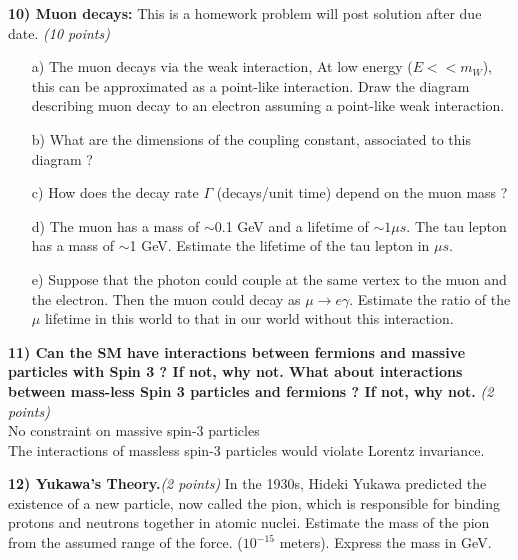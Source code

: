 {\textbf{10) Muon decays: } This is a homework problem will post solution after due date. \hfill \textit{(10 points)}\\
\begin{itemize}
  \item[a)]{ The muon decays via the weak interaction,  At low energy ($E << m_W$), this can be approximated as a point-like interaction. 
  Draw the diagram describing muon decay to an electron assuming a point-like weak interaction.
\vspace*{1.5in}
}
  \item[b)]{ What are the dimensions of the coupling constant, associated to this diagram  ?
\vspace*{1.0in}
  }
  \item[c)] How does the decay rate $\Gamma$ (decays/unit time)  depend on the muon mass ? 
\vspace*{1.0in}
  \item[d)]{ The muon has a mass of $\sim$0.1 GeV and a lifetime of $\sim 1 \mu s$. The tau lepton has a mass of {$\sim$1 GeV}. Estimate the lifetime of the tau lepton in $\mu s$.
\vspace*{2.4in}
}
  \item[e)] {Suppose that the photon could couple at the same vertex to the muon and the electron. Then the muon could decay as $\mu\rightarrow e \gamma$. 
  Estimate the ratio of the $\mu$ lifetime in this world to that in our world without this interaction.
  \vspace*{3.0in}
  }
\end{itemize}

\textbf{11) Can the SM have interactions between fermions and massive particles with Spin 3 ? If not, why not.  What about interactions between mass-less Spin 3 particles and fermions ? If not, why not. }\hfill \textit{(2 points)}\\

No constraint on massive spin-3 particles\\
The interactions of massless spin-3 particles would violate Lorentz invariance. 

\vspace*{0.3in}

\textbf{12) Yukawa’s Theory.}\hfill \textit{(2 points)}
In the 1930s, Hideki Yukawa predicted the existence of a new particle, now called the pion, which is responsible for binding protons and neutrons together in atomic nuclei. 
Estimate the mass of the pion from the assumed range of the force. ($10^{-15}$ meters). 
Express the mass in GeV.

}
